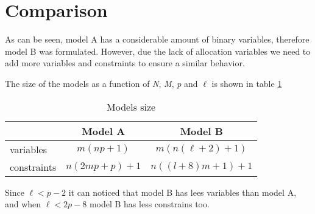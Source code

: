 \section{Comparison}
As can be seen,
model A
has a considerable amount of binary variables,
therefore model B was formulated.
However, due the lack of allocation variables
we need to add more variables and constraints
to ensure a similar behavior.

The size of the models
as a function of \textit{N}, \textit{M}, \textit{p} and $\ell$
is shown in table \ref{tab:modsize}

\begin{table}[h]
  \label{tab:modsize}
  \centering
  \begin{tabular}{c|c|c|}
    \cline{2-3}
    & Model A & Model B \\ \hline
    \multicolumn{1}{|l|}{variables} &
    $m(np+1)$ &
    $m(n(\ell+2)+1)$ \\ \hline
    \multicolumn{1}{|l|}{constraints} &
    $n(2mp+p)+1$ &
    $n((l+8)m+1)+1$ \\ \hline
  \end{tabular}
  \caption{Models size}
\end{table}

Since $\ell < p - 2$
it can noticed
that model B
has lees variables
than model A,
and when $\ell < 2p - 8$
model B has
less constrains too.
